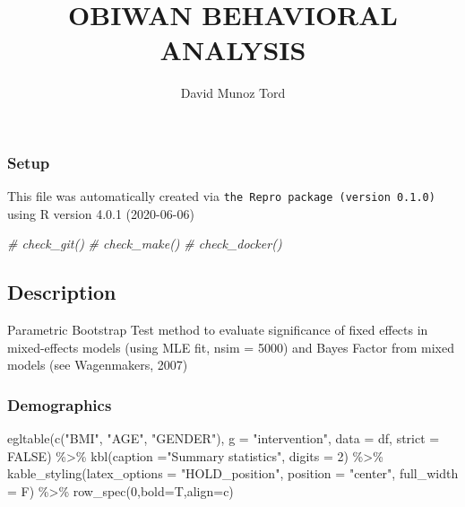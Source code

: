 \documentclass[
]{article}
\title{OBIWAN BEHAVIORAL ANALYSIS}
\author{David Munoz Tord}
\date{}
\newenvironment{Shaded}{\begin{snugshade}}{\end{snugshade}}
\newcommand{\AttributeTok}[1]{\textcolor[rgb]{0.77,0.63,0.00}{#1}}
\newcommand{\CommentTok}[1]{\textcolor[rgb]{0.56,0.35,0.01}{\textit{#1}}}
\newcommand{\ConstantTok}[1]{\textcolor[rgb]{0.00,0.00,0.00}{#1}}
\newcommand{\DecValTok}[1]{\textcolor[rgb]{0.00,0.00,0.81}{#1}}
\newcommand{\FunctionTok}[1]{\textcolor[rgb]{0.00,0.00,0.00}{#1}}
\newcommand{\NormalTok}[1]{#1}
\newcommand{\SpecialCharTok}[1]{\textcolor[rgb]{0.00,0.00,0.00}{#1}}
\newcommand{\StringTok}[1]{\textcolor[rgb]{0.31,0.60,0.02}{#1}}
\begin{document}
\maketitle

\hypertarget{setup}{%
\subsubsection{Setup}\label{setup}}

This file was automatically created via
\texttt{the\ Repro\ package\ (version\ 0.1.0)} using R version 4.0.1
(2020-06-06)

\begin{Shaded}
\begin{Highlighting}[]
\CommentTok{\# check\_git()}
\CommentTok{\# check\_make()}
\CommentTok{\# check\_docker()}
\end{Highlighting}
\end{Shaded}

\hypertarget{description}{%
\subsection{Description}\label{description}}

Parametric Bootstrap Test method to evaluate significance of fixed
effects in mixed-effects models (using MLE fit, nsim = 5000) and Bayes
Factor from mixed models (see Wagenmakers, 2007)

\hypertarget{demographics}{%
\subsubsection{Demographics}\label{demographics}}

\begin{Shaded}
\begin{Highlighting}[]
\FunctionTok{egltable}\NormalTok{(}\FunctionTok{c}\NormalTok{(}\StringTok{"BMI"}\NormalTok{, }\StringTok{"AGE"}\NormalTok{, }\StringTok{"GENDER"}\NormalTok{), }
  \AttributeTok{g =} \StringTok{"intervention"}\NormalTok{, }\AttributeTok{data =}\NormalTok{ df, }\AttributeTok{strict =} \ConstantTok{FALSE}\NormalTok{) }\SpecialCharTok{\%\textgreater{}\%}
  \FunctionTok{kbl}\NormalTok{(}\AttributeTok{caption =}\StringTok{"Summary statistics"}\NormalTok{, }\AttributeTok{digits =} \DecValTok{2}\NormalTok{) }\SpecialCharTok{\%\textgreater{}\%}
  \FunctionTok{kable\_styling}\NormalTok{(}\AttributeTok{latex\_options =} \StringTok{"HOLD\_position"}\NormalTok{, }\AttributeTok{position =} \StringTok{"center"}\NormalTok{, }\AttributeTok{full\_width =}\NormalTok{ F) }\SpecialCharTok{\%\textgreater{}\%}
  \FunctionTok{row\_spec}\NormalTok{(}\DecValTok{0}\NormalTok{,}\AttributeTok{bold=}\NormalTok{T,}\AttributeTok{align=}\StringTok{\textquotesingle{}c\textquotesingle{}}\NormalTok{)}
\end{Highlighting}
\end{Shaded}
\end{document}
